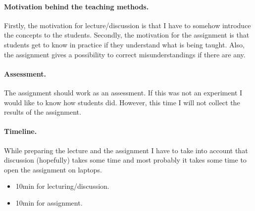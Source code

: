 \documentclass[a4paper,12pt]{article}
\begin{document}
\paragraph{Motivation behind the teaching methods.} Firstly, the motivation for
lecture/discussion is that I have to somehow introduce the concepts to the
students. Secondly, the motivation for the assignment is that students get to
know in practice if they understand what is being taught. Also, the assignment
gives a possibility to correct misunderstandings if there are any.

\paragraph{Assessment.} The assignment should work as an assessment. If this was
not an experiment I would like to know how students did. However, this time I will not collect the results of the assignment.

\paragraph{Timeline.} While preparing the lecture and the assignment I have to
take into account that discussion (hopefully) takes some time and most probably
it takes some time to open the assignment on laptops.
\begin{itemize}
    \item 10min for lecturing/discussion.
    \item 10min for assignment.
\end{itemize}
\end{document}
